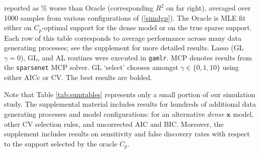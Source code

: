 \documentclass[12pt]{article}
\newcommand{\bm}[1]{\mathbf{#1}}
\begin{document}
\begin{table}
{reported as  \% worse than Oracle (corresponding $R^2$ on far right),
averaged over 1000  samples from various configurations of (\ref{simdgp}).
The Oracle is MLE fit either on  $C_p$-optimal support for the dense model or
on the true sparse support. Each row of this table corresponds to average
performance across many data generating processes; see the supplement for more
detailed results.  Lasso (GL $\gamma=0$), GL, and AL routines were executed
in {\tt gamlr}.  MCP denotes results from the {\tt sparsenet} MCP solver. GL
`select' chooses amongst $\gamma \in \{0,1,10\}$ using either AICc or CV.
The best results are bolded.}
\end{table}


Note that Table \ref{tab:sumtables} represents only a small portion of our
simulation study.  The supplemental material includes results for hundreds of
additional data generating processes and model configurations: for an alternative {\it dense} $\bm{x}$ model, other CV selection rules, and uncorrected AIC and BIC.  Moreover, the supplement includes results on sensitivity and false
discovery rates with respect to the support selected by the oracle $C_p$.
\end{document}
